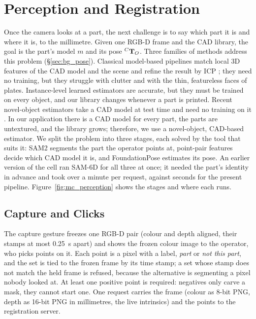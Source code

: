 \section{Perception and Registration}
\label{sec:mc_perception}
Once the camera looks at a part, the next challenge is to say which part it is and where it is,
to the millimetre. Given one RGB-D frame and the CAD library, the goal is the part's model $m$
and its pose ${}^{C}\mathbf{T}_{O}$. Three families of methods address this problem (\S\ref{sec:bg_pose}).
Classical model-based pipelines match local 3D features of the CAD model and the scene and refine
the result by ICP \cite{drost2010ppf,birdal2015ppf,rusu2009fpfh}; they need no training, but they
struggle with clutter and with the thin, featureless faces of plates. Instance-level learned
estimators are accurate, but they must be trained on every object, and our library changes
whenever a part is printed. Recent novel-object estimators take a CAD model at test time and need
no training on it \cite{wen2024foundationpose,lin2024sam6d}. In our application there is a CAD
model for every part, the parts are untextured, and the library grows; therefore, we use a
novel-object, CAD-based estimator. We split the problem into three stages, each solved by the tool
that suits it: SAM2 segments the part the operator points at, point-pair features decide which CAD
model it is, and FoundationPose estimates its pose. An earlier version of the cell ran SAM-6D
\cite{lin2024sam6d} for all three at once; it needed the part's identity in advance and took over
a minute per request, against seconds for the present pipeline. Figure~\ref{fig:mc_perception}
shows the stages and where each runs.

\subsection{Capture and Clicks}
\label{sec:per_capture}
The capture gesture freezes one RGB-D pair (colour and depth aligned, their stamps at most 0.25~s
apart) and shows the frozen colour image to the operator, who picks points on it. Each point is a
pixel with a label, \emph{part} or \emph{not this part}, and the set is tied to the frozen frame by
its time stamp; a set whose stamp does not match the held frame is refused, because the
alternative is segmenting a pixel nobody looked at. At least one positive point is required:
negatives only carve a mask, they cannot start one. One request carries the frame (colour as
8-bit PNG, depth as 16-bit PNG in millimetres, the live intrinsics) and the points to the
registration server.

